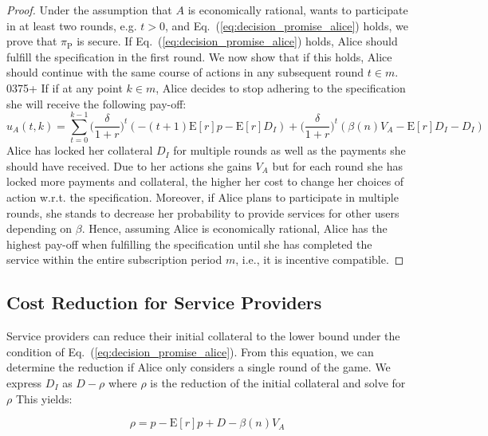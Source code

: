 \documentclass[runningheads]{llncs}
\begin{document}
\begin{proof}
Under the assumption that $A$ is economically rational, wants to participate in at least two rounds, e.g. $t>0$, and Eq.~(\ref{eq:decision_promise_alice}) holds, we prove that $\pi_{\mathrm{P}}$ is secure.
If Eq.~(\ref{eq:decision_promise_alice}) holds, Alice should fulfill the specification in the first round.
We now show that if this holds, Alice should continue with the same course of actions in any subsequent round $t \in m$.
0375+
If if at any point $k \in m$, Alice decides to stop adhering to the specification she will receive the following pay-off:
\begin{equation}
    u_A(t,k) = \sum^{k-1}_{t=0} \big(\frac{\delta}{1+r} \big)^{t} (- (t+1)\mathrm{E}[r]p -\mathrm{E}[r]D_{I})+\big(\frac{\delta}{1+r} \big)^{t} (\beta(n) V_A - \mathrm{E}[r]D_{I}-D_{I})
\end{equation}
Alice has locked her collateral $D_I$ for multiple rounds as well as the payments she should have received.
Due to her actions she gains $V_A$ but for each round she has locked more payments and collateral, the higher her cost to change her choices of action w.r.t. the specification.
Moreover, if Alice plans to participate in multiple rounds, she stands to decrease her probability to provide services for other users depending on $\beta$.
Hence, assuming Alice is economically rational, Alice has the highest pay-off when fulfilling the specification until she has completed the service within the entire subscription period $m$, i.e., it is incentive compatible.
\end{proof}

\subsection{Cost Reduction for Service Providers}
Service providers can reduce their initial collateral to the lower bound under the condition of Eq.~(\ref{eq:decision_promise_alice}).
From this equation, we can determine the reduction if Alice only considers a single round of the game.
We express $D_I$ as $D - \rho$ where $\rho$ is the reduction of the initial collateral and solve for $\rho$
This yields:

\begin{equation}
    \label{eq:single_round_reduction}
    \rho = p - \mathrm{E}[r]p + D - \beta(n) V_A
\end{equation}
\end{document}
